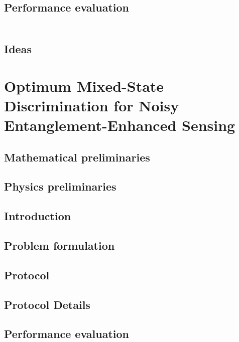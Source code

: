 \documentclass[../../note.tex]{subfiles}
\begin{document}
\subsection{Performance evaluation}

\begin{lemma}
    \begin{align}
    \end{align}
\end{lemma}

\subsection{Ideas}

\section{Optimum Mixed-State Discrimination for Noisy Entanglement-Enhanced Sensing \cite{zhuang2017optimum}}
\subsection{Mathematical preliminaries}


\subsection{Physics preliminaries}


\subsection{Introduction}


\subsection{Problem formulation}


\subsection{Protocol}


\subsection{Protocol Details}


\subsection{Performance evaluation}
\end{document}
